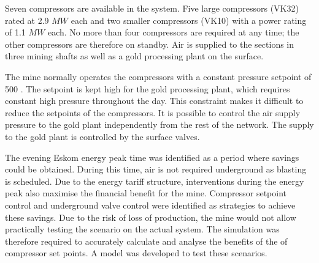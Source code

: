 \par 
 Seven compressors are available in the system. Five large compressors (VK32) rated at 2.9 $MW$ each and two smaller compressors (VK10) with a power rating of 1.1 $MW$ each. No more than four compressors are required at any time; the other compressors are therefore on standby. Air is supplied to the sections in three mining shafts as well as a gold processing plant on the surface. 
 \par 
 The mine normally operates the compressors with a constant pressure setpoint of 500 . The setpoint is kept high for the gold processing plant, which requires constant high pressure throughout the day. This constraint makes it difficult to reduce the setpoints of the compressors. It is possible to control the air supply pressure to the gold plant independently from the rest of the network. The supply to the gold plant is controlled by the surface valves.
 \par 
 The evening Eskom energy peak time was identified as a period where savings could be obtained. During this time, air is not required underground as blasting is scheduled. Due to the energy tariff structure, interventions during the energy peak also maximise the financial benefit for the mine. Compressor setpoint control and underground valve control were identified as strategies to achieve these savings. Due to the risk of loss of production, the mine would not allow practically testing the scenario on the actual system. The simulation was therefore required to accurately calculate and analyse the benefits of the of compressor set points. A model was developed to test these scenarios.

